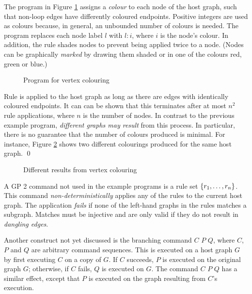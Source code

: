 \begin{example}
The program in Figure \ref{fig:vertex-colouring} assigns a \emph{colour}\/ to each node of the host graph, such that non-loop edges have differently coloured endpoints. Positive integers are used as colours because, in general, an unbounded number of colours is needed. The program replaces each node label $l$\/ with $l{:}i$, where $i$\/ is the node's colour. In addition, the rule  shades nodes to prevent being applied twice to a node. (Nodes can be graphically \emph{marked}\/ by drawing them shaded or in one of the colours red, green or blue.)

\begin{figure}[htb]
\begin{center}
 
\end{center}
\caption{Program for vertex colouring}\label{fig:vertex-colouring}
\end{figure}

Rule  is applied to the host graph as long as there are edges with identically coloured endpoints. It can can be shown that this terminates after at most $n^2$ rule applications, where $n$\/ is the number of nodes. In contrast to the previous example program, \emph{different graphs may result}\/ from this process. In particular, there is no guarantee that the number of colours produced is minimal. For instance, Figure \ref{fig:colour_results} shows two different colourings produced for the same host graph.
\qed
\end{example}

\begin{figure}[htb]
\begin{center}
 
\end{center}
\caption{Different results from vertex colouring}\label{fig:colour_results}
\end{figure}

A GP 2 command not used in the example programs is a rule set $\mathtt{\{}r_1,\dots,r_n\mathtt{\}}$. This command \emph{non-deterministically} applies any of the rules to the current host graph. The application \emph{fails}\/ if none of the left-hand graphs in the rules matches a subgraph. Matches must be injective and are only valid if they do not result in \emph{dangling edges}.

Another construct not yet discussed is the branching command  $C$  $P$  $Q$, where $C$, $P$ and $Q$ are arbitrary command sequences. This is executed on a host graph $G$ by first executing $C$ on a copy of $G$. If $C$ succeeds, $P$\/ is executed on the original graph $G$; otherwise, if $C$ fails, $Q$ is executed on $G$. The command  $C$  $P$  $Q$ has a similar effect, except that $P$\/ is executed on the graph resulting from $C$'s execution. 
